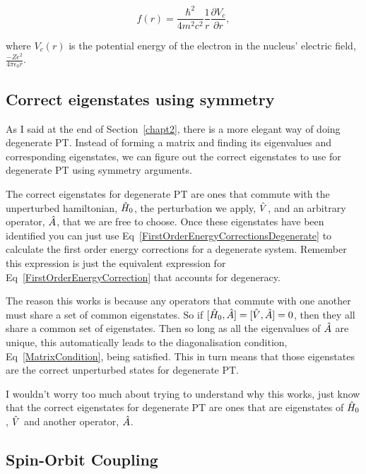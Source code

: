 \begin{equation}
    f(r) = \frac{\hbar^2}{4m^2c^2} \frac{1}{r} \frac{\partial V_c}{\partial r},
    \label{f(r)Form}
\end{equation}

\noindent where $V_c(r)$ is the potential energy of the electron in the nucleus' electric field, $\frac{-Ze^2}{4\pi\epsilon_0 r}$.

\subsection{Correct eigenstates using symmetry}

As I said at the end of Section~\ref{chapt2}, there is a more elegant way of doing degenerate PT. Instead of forming a matrix and finding its eigenvalues and corresponding eigenstates, we can figure out the correct eigenstates to use for degenerate PT using symmetry arguments.

\noindent The correct eigenstates for degenerate PT are ones that commute with the unperturbed hamiltonian, $\Hat{H}_0$, the perturbation we apply, $\Hat{V}$, and an arbitrary operator, $\Hat{A}$, that we are free to choose. Once these eigenstates have been identified you can just use Eq~\ref{FirstOrderEnergyCorrectionsDegenerate} to calculate the first order energy corrections for a degenerate system. Remember this expression is just the equivalent expression for Eq~\ref{FirstOrderEnergyCorrection} that accounts for degeneracy.

\noindent The reason this works is because any operators that commute with one another must share a set of common eigenstates. So if $[\Hat{H}_0, \Hat{A}] = [\Hat{V}, \Hat{A}] = 0$, then they all share a common set of eigenstates. Then so long as all the eigenvalues of $\Hat{A}$ are unique, this automatically leads to the diagonalisation condition, Eq~\ref{MatrixCondition}, being satisfied. This in turn means that those eigenstates are the correct unperturbed states for degenerate PT.

\noindent I wouldn't worry too much about trying to understand why this works, just know that the correct eigenstates for degenerate PT are ones that are eigenstates of $\Hat{H}_0$, $\Hat{V}$ and another operator, $\Hat{A}$.

\subsection{Spin-Orbit Coupling}

